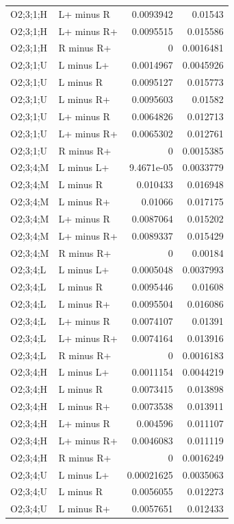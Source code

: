 {\begin{longtable}{@{}llrr@{}}
O2;3;1;H & L+ minus R & 0.0093942 & 0.01543 \\
O2;3;1;H & L+ minus R+ & 0.0095515 & 0.015586 \\
O2;3;1;H & R minus R+ & 0 & 0.0016481 \\
O2;3;1;U & L minus L+ & 0.0014967 & 0.0045926 \\
O2;3;1;U & L minus R & 0.0095127 & 0.015773 \\
O2;3;1;U & L minus R+ & 0.0095603 & 0.01582 \\
O2;3;1;U & L+ minus R & 0.0064826 & 0.012713 \\
O2;3;1;U & L+ minus R+ & 0.0065302 & 0.012761 \\
O2;3;1;U & R minus R+ & 0 & 0.0015385 \\
O2;3;4;M & L minus L+ & 9.4671e-05 & 0.0033779 \\
O2;3;4;M & L minus R & 0.010433 & 0.016948 \\
O2;3;4;M & L minus R+ & 0.01066 & 0.017175 \\
O2;3;4;M & L+ minus R & 0.0087064 & 0.015202 \\
O2;3;4;M & L+ minus R+ & 0.0089337 & 0.015429 \\
O2;3;4;M & R minus R+ & 0 & 0.00184 \\
O2;3;4;L & L minus L+ & 0.0005048 & 0.0037993 \\
O2;3;4;L & L minus R & 0.0095446 & 0.01608 \\
O2;3;4;L & L minus R+ & 0.0095504 & 0.016086 \\
O2;3;4;L & L+ minus R & 0.0074107 & 0.01391 \\
O2;3;4;L & L+ minus R+ & 0.0074164 & 0.013916 \\
O2;3;4;L & R minus R+ & 0 & 0.0016183 \\
O2;3;4;H & L minus L+ & 0.0011154 & 0.0044219 \\
O2;3;4;H & L minus R & 0.0073415 & 0.013898 \\
O2;3;4;H & L minus R+ & 0.0073538 & 0.013911 \\
O2;3;4;H & L+ minus R & 0.004596 & 0.011107 \\
O2;3;4;H & L+ minus R+ & 0.0046083 & 0.011119 \\
O2;3;4;H & R minus R+ & 0 & 0.0016249 \\
O2;3;4;U & L minus L+ & 0.00021625 & 0.0035063 \\
O2;3;4;U & L minus R & 0.0056055 & 0.012273 \\
O2;3;4;U & L minus R+ & 0.0057651 & 0.012433 \\

\end{longtable}}

